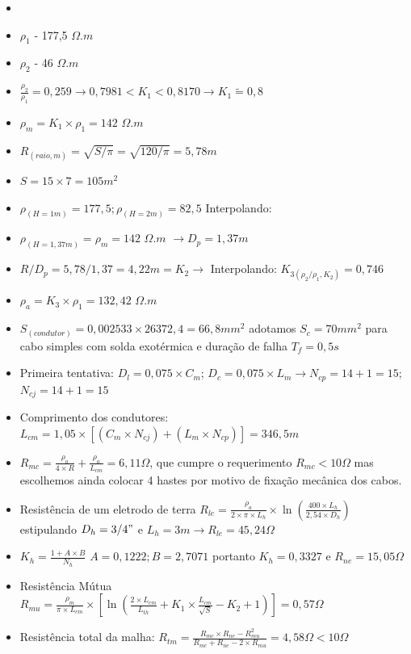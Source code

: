 \begin{itemize}
\item
\item ${\rho}_{1}$ - 177,5 $\Omega.m$     
\item ${\rho}_{2}$ - 46 $\Omega.m$   
\item $\frac{\rho_2}{\rho_1}= 0,259 \longrightarrow 0,7981<K_1<0,8170\longrightarrow K_1\tilde{=}0,8 $ 
\item $\rho_m = K_1\times\rho_1 = 142$ $\Omega.m$ 
\item $R_{(raio, m)} = \sqrt{S/\pi} = \sqrt{120/\pi} = 5,78m$
\item $S = 15\times7 = 105m^2$
\item $\rho_{(H=1m)} = 177,5 ; \rho_{(H=2m)}=82,5 $ Interpolando:
\item $\rho_{(H=1,37m)} = \rho_m = 142$ $\Omega.m$ $\longrightarrow D_p = 1,37m $
\item $R/D_p = 5,78/1,37 = 4,22m = K_2 \longrightarrow$ Interpolando: $K_{3(\rho_2/\rho_1, K_2)} = 0,746$
\item $\rho_a = K_3\times\rho_1 = 132,42$ $\Omega.m$ 
\item $S_{(condutor)} = 0,002533\times 26372,4 = 66,8mm^2$ adotamos $S_c=70mm^2$ para cabo simples com solda exotérmica e duração de falha $T_f = 0,5s$
\item Primeira tentativa: $D_l = 0,075\times C_m $; $D_c = 0,075\times L_m \longrightarrow N_{cp}= 14 + 1 = 15$; $N_{cj} = 14 + 1 = 15$
\item Comprimento dos condutores: $L_{cm}= 1,05\times[(C_m\times N_{cj})+(L_m\times N_{cp})] = 346,5m$
\item $R_{mc} = \frac{\rho_a}{4\times R} + \frac{\rho_a}{L_{cm}} = 6,11\Omega$, que cumpre o requerimento $R_{mc}<10\Omega$ mas escolhemos ainda colocar 4 hastes por motivo de fixação mecânica dos cabos.
\item Resistência de um eletrodo de terra $R_{le} = \frac{\rho_a}{2\times\pi\times L_h}\times\ln(\frac{400\times L_h}{2,54\times D_h}) $ estipulando $D_h = 3/4"$ e $L_h=3m \longrightarrow R_{le} = 45,24\Omega$
\item $K_h = \frac{1+A\times B}{N_h} $ $A=0,1222 ;B=2,7071 $ portanto $K_h=0,3327$ e $R_{ne}=15,05\Omega$ 
\item Resistência Mútua $R_{mu} = \frac{\rho_m}{\pi\times L_{cm}}\times[\ln(\frac{2\times L_{cm}}{L_{th}}+K_1\times\frac{L_{cm}}{\sqrt{S}} - K_2 + 1)] = 0,57\Omega$
\item Resistência total da malha: $R_{tm} = \frac{R_{mc}\times R_{ne} - R_{mu}^2}{R_{mc}+R_{ne}-2\times R_{mu}} = 4,58\Omega < 10\Omega$

\end{itemize}



